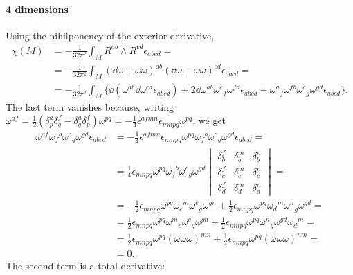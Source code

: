\documentclass[a4paper,12pt]{book}
\begin{document}
\paragraph{4 dimensions}
Using the nihilponency of the exterior derivative,
\begin{align*}
\chi(M)&=-\frac1{32\pi^2}\int_MR^{ab}\wedge R^{cd}\epsilon_{abcd}=\\
&=-\frac1{32\pi^2}\int_M(\dd\omega+\omega\omega)^{ab}(\dd\omega+\omega\omega)^{cd}\epsilon_{abcd}=\\
&=-\frac1{32\pi^2}\int_M\bigl\{\dd(\omega^{ab}\dd\omega^{cd}\epsilon_{abcd})+2\dd\omega^{ab}\omega^c{}_f\omega^{fd}\epsilon_{abcd}+\omega^a{}_f\omega^{fb}\omega^c{}_g\omega^{gd}\epsilon_{abcd}\bigr\}.
\end{align*}
The last term vanishes because, writing $\omega^{af}=\frac12(\delta^a_p\delta^f_q-\delta^a_q\delta^f_p)\omega^{pq}=-\frac14\epsilon^{afmn}\epsilon_{mnpq}\omega^{pq}$, we get
\begin{align*}
\omega^{af}\omega_f{}^b\omega^c{}_g\omega^{gd}\epsilon_{abcd}&=-\frac14\epsilon^{afmn}\epsilon_{mnpq}\omega^{pq}\omega_f{}^b\omega^c{}_g\omega^{gd}\epsilon_{abcd}=\\
&=\frac14\epsilon_{mnpq}\omega^{pq}\omega_f{}^b\omega^c{}_g\omega^{gd}
\begin{vmatrix}
\delta^f_b & \delta^m_b & \delta^n_b\\
\delta^f_c & \delta^m_c & \delta_c^n\\
\delta^f_d & \delta^m_d & \delta^n_d
\end{vmatrix}=\\
&=-\frac12\epsilon_{mnpq}\omega^{pq}\omega_c{}^m\omega^c{}_g\omega^{gn}+\frac12\epsilon_{mnpq}\omega^{pq}\omega_d{}^m\omega^n{}_g\omega^{gd}=\\
&=\frac12\epsilon_{mnpq}\omega^{pq}\omega^m{}_c\omega^c{}_g\omega^{gn}+\frac12\epsilon_{mnpq}\omega^{pq}\omega^n{}_g\omega^{gd}\omega_d{}^m=\\
&=\frac12\epsilon_{mnpq}\omega^{pq}(\omega\omega\omega)^{mn}+\frac12\epsilon_{mnpq}\omega^{pq}(\omega\omega\omega)^{nm}=\\
&=0.
\end{align*}
The second term is a total derivative:
\end{document}
